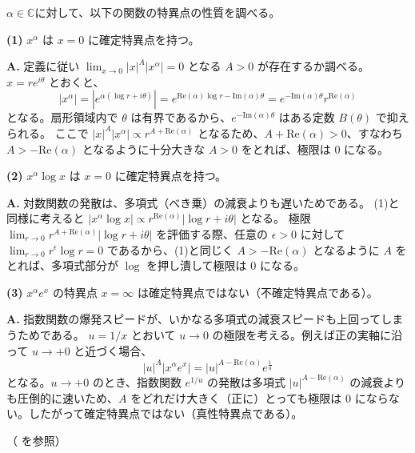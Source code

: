 \begin{example}\label{ex:regular_singular_points}
    $\alpha\in\mathbb{C}$に対して、以下の関数の特異点の性質を調べる。
    
    \textbf{(1)} $x^{\alpha}$ は $x=0$ に確定特異点を持つ。
    \begin{Q}[なぜ $x=0$ は確定特異点といえるのか？]
    \textbf{A.} 定義に従い $\lim_{x\to 0} |x|^A |x^\alpha| = 0$ となる $A>0$ が存在するか調べる。
    $x = r e^{i\theta}$ とおくと、
    \[
    |x^{\alpha}| = |e^{\alpha(\log r + i\theta)}| = e^{\text{Re}(\alpha)\log r - \text{Im}(\alpha)\theta} = e^{-\text{Im}(\alpha)\theta} r^{\text{Re}(\alpha)}
    \]
    となる。扇形領域内で $\theta$ は有界であるから、$e^{-\text{Im}(\alpha)\theta}$ はある定数 $B(\theta)$ で抑えられる。
    ここで $|x|^A |x^\alpha| \propto r^{A + \text{Re}(\alpha)}$ となるため、$A + \text{Re}(\alpha) > 0$、すなわち $A > -\text{Re}(\alpha)$ となるように十分大きな $A>0$ をとれば、極限は $0$ になる。
    \end{Q}

    \textbf{(2)} $x^{\alpha}\log x$ は $x=0$ に確定特異点を持つ。
    \begin{Q}
    \textbf{A.} 対数関数の発散は、多項式（べき乗）の減衰よりも遅いためである。
    (1)と同様に考えると $|x^{\alpha}\log x| \propto r^{\text{Re}(\alpha)}|\log r + i\theta|$ となる。
    極限 $\lim_{r\to 0} r^{A + \text{Re}(\alpha)} |\log r + i\theta|$ を評価する際、任意の $\epsilon > 0$ に対して $\lim_{r\to 0} r^\epsilon \log r = 0$ であるから、(1)と同じく $A > -\text{Re}(\alpha)$ となるように $A$ をとれば、多項式部分が $\log$ を押し潰して極限は $0$ になる。
    \end{Q}

    \textbf{(3)} $x^{\alpha}e^{x}$ の特異点 $x=\infty$ は確定特異点ではない（不確定特異点である）。
    \begin{Q}[なぜ $x=\infty$ で条件を満たさないのか？]
    \textbf{A.} 指数関数の爆発スピードが、いかなる多項式の減衰スピードも上回ってしまうためである。
    $u = 1/x$ とおいて $u \to 0$ の極限を考える。例えば正の実軸に沿って $u \to +0$ と近づく場合、
    \[
    |u|^A |x^{\alpha}e^{x}| = |u|^{A - \text{Re}(\alpha)} e^{\frac{1}{u}}
    \]
    となる。$u \to +0$ のとき、指数関数 $e^{1/u}$ の発散は多項式 $|u|^{A-\text{Re}(\alpha)}$ の減衰よりも圧倒的に速いため、$A$ をどれだけ大きく（正に）とっても極限は $0$ にならない。したがって確定特異点ではない（真性特異点である）。
    \end{Q}
    
    （\cite[p.60 例2.2]{book:okamoto} を参照）
\end{example}

